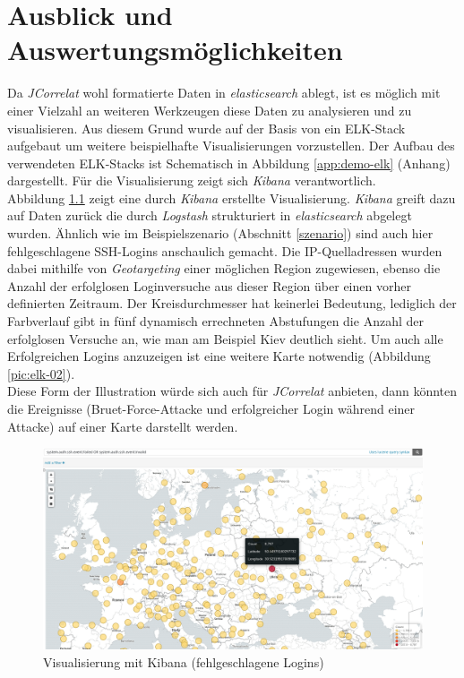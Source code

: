 \chapter{Ausblick und Auswertungsmöglichkeiten}\label{ausblick}
\thispagestyle{fancy}

Da \textit{JCorrelat} wohl formatierte Daten in \textit{elasticsearch} ablegt, ist es 
möglich mit einer Vielzahl an weiteren Werkzeugen diese Daten zu analysieren und zu 
visualisieren. Aus diesem Grund wurde auf der Basis von \cite{kleindienst} ein 
ELK-Stack aufgebaut um weitere beispielhafte Visualisierungen vorzustellen. Der 
Aufbau des verwendeten ELK-Stacks ist Schematisch in Abbildung \ref{app:demo-elk} (Anhang)
dargestellt. Für die Visualisierung zeigt sich \textit{Kibana} verantwortlich.\\
Abbildung \ref{pic:elk-01} zeigt eine durch \textit{Kibana} erstellte Visualisierung. 
\textit{Kibana} greift dazu auf Daten zurück die durch \textit{Logstash} strukturiert in 
\textit{elasticsearch} abgelegt wurden.
Ähnlich wie im Beispielszenario (Abschnitt \ref{szenario}) sind auch hier fehlgeschlagene 
SSH-Logins anschaulich gemacht. Die IP-Quelladressen wurden dabei mithilfe von 
\textit{Geotargeting} einer möglichen Region zugewiesen, ebenso die Anzahl der 
erfolglosen Loginversuche aus dieser Region über einen vorher definierten Zeitraum. Der 
Kreisdurchmesser hat keinerlei Bedeutung, lediglich der Farbverlauf gibt in fünf 
dynamisch errechneten Abstufungen die Anzahl der erfolglosen Versuche an, wie man am 
Beispiel Kiev deutlich sieht. Um auch alle Erfolgreichen Logins anzuzeigen ist eine 
weitere Karte notwendig (Abbildung \ref{pic:elk-02}).\\
Diese Form der Illustration würde sich auch für \textit{JCorrelat} anbieten, dann 
könnten die Ereignisse (Bruet-Force-Attacke und erfolgreicher Login während einer Attacke)
auf einer Karte darstellt werden.

\begin{figure}[htbp]
    \caption{Visualisierung mit Kibana (fehlgeschlagene Logins)}
    \label{pic:elk-01}\vspace{0.2cm}
    \centering
    \includegraphics[scale=0.28]{img/elk-01}  
\end{figure}

